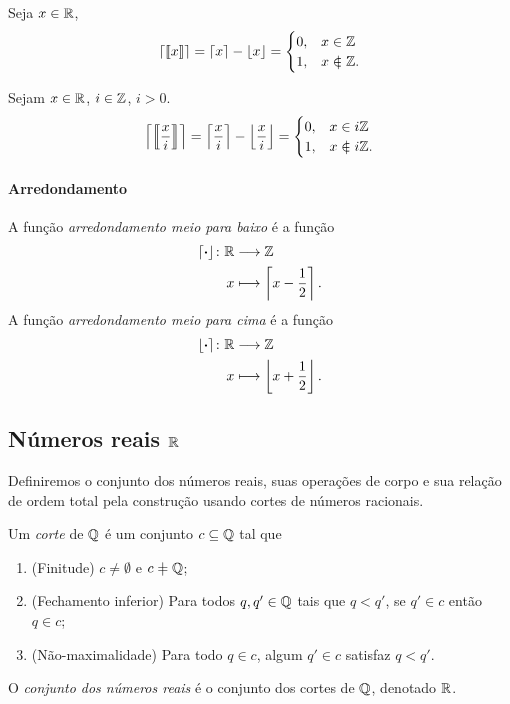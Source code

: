 \begin{exercise}
Seja $x \in \mathbb{R}$,
	\begin{equation*}
	\teto{\resfra{x}} = \teto{x} - \chao{x} = \begin{cases}
			0,& x \in \Z \\
			1,& x \notin \Z.
		\end{cases}
	\end{equation*}
\end{exercise}


\begin{exercise}
Sejam $x \in \mathbb{R}$, $i \in \mathbb{Z}$, $i > 0$.
	\begin{equation*}
	\teto{\resfra{ \frac{x}{i} }} = \teto{\frac{x}{i}} - \chao{\frac{x}{i}}  = \begin{cases}
			0,& x \in i\Z \\
			1,& x \notin i\Z.
		\end{cases}
	\end{equation*}
\end{exercise}


\paragraph{Arredondamento}

\begin{definition}
A função \emph{arredondamento meio para baixo} é a função
	\begin{align*}
	{\left\lceil{\bm{\cdot}}\right\rfloor}\colon {\mathbb{R}} &\longrightarrow {\mathbb{Z}} \\{x} &\longmapsto \left\lceil{x-\frac{1}{2}}\right\rceil.
	\end{align*}
A função \emph{arredondamento meio para cima} é a função
	\begin{align*}
	{\left\lfloor{\bm{\cdot}}\right\rceil}\colon {\mathbb{R}} &\longrightarrow {\mathbb{Z}} \\{x} &\longmapsto \left\lfloor{x+\frac{1}{2}}\right\rfloor.
	\end{align*}
\end{definition}

\subsection{Números reais \texorpdfstring{$\mathbb{R}$}{}}

Definiremos o conjunto dos números reais, suas operações de corpo e sua relação de ordem total pela construção usando cortes de números racionais.

\begin{definition}
Um \emph{corte} de $\mathbb{Q}$ é um conjunto $c \subseteq \mathbb{Q}$ tal que
	\begin{enumerate}
	\item (Finitude) $c \neq \emptyset$ e $c \neq \Q$;
	\item (Fechamento inferior) Para todos $q, q' \in \mathbb{Q}$ tais que $q < q'$, se $q' \in c$ então $q \in c$;
	\item (Não-maximalidade) Para todo $q \in c$, algum $q' \in c$ satisfaz $q < q'$.
	\end{enumerate}
O \emph{conjunto dos números reais} é o conjunto dos cortes de $\mathbb{Q}$, denotado $\mathbb{R}$.
\end{definition}

